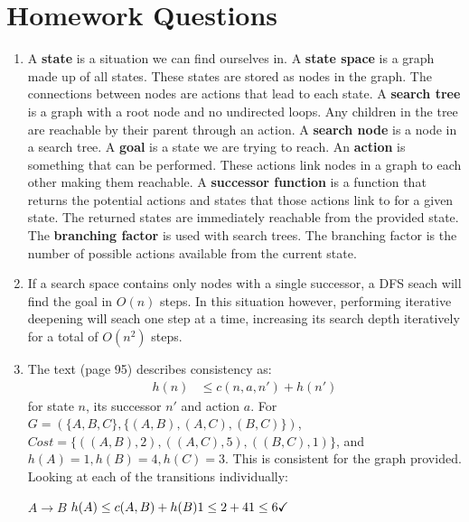 \documentclass{article}
\begin{document}
\section*{Homework Questions}
\begin{enumerate}
\item A \textbf{state} is a situation we can find ourselves in.\newline
A \textbf{state space} is a graph made up of all states.  These states are stored as nodes in the graph.  The connections between nodes are actions that lead to each state.\newline
A \textbf{search tree} is a graph with a root node and no undirected loops.  Any children in the tree are reachable by their parent through an action. \newline
A \textbf{search node} is a node in a search tree. \newline
A \textbf{goal} is a state we are trying to reach.
An \textbf{action} is something that can be performed.  These actions link nodes in a graph to each other making them reachable. \newline
A \textbf{successor function} is a function that returns the potential actions and states that those actions link to for a given state.  The returned states are immediately reachable from the provided state.\newline
The \textbf{branching factor} is used with search trees.  The branching factor is the number of possible actions available from the current state.
\item If a search space contains only nodes with a single successor, a DFS seach will find the goal in $O(n)$ steps. In this situation however, performing iterative deepening will seach one step at a time, increasing its search depth iteratively for a total of $O(n^{2})$ steps.
\item The text (page 95) describes consistency as:
\begin{eqnarray*}
h(n) &\leq c(n,a,n') + h(n')
\end{eqnarray*}
for state $n$, its successor $n'$ and action $a$.  For $G = (\{A,B,C\},\{(A,B), (A,C), (B,C)\})$, $Cost = \{((A,B),2), ((A,C),5), ((B,C), 1)\}$, and $h(A) = 1, h(B) = 4, h(C) = 3$. 
This is consistent for the graph provided.  Looking at each of the transitions individually: \newline
\begin{multicols}{3}
$A \rightarrow B$ \newline
$h(A) \le c(A,B) + h(B) \newline
1 \le 2 + 4 \newline
1 \le 6 \checkmark$ 


\end{multicols}
\end{enumerate}
\end{document}
